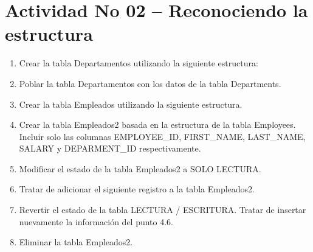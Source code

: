 \section{Actividad No 02 – Reconociendo la estructura} 

\begin{enumerate}[1.]
	\item Crear la tabla Departamentos utilizando la siguiente estructura:
	\item Poblar la tabla Departamentos con los datos de la tabla Departments.
	\item Crear la tabla Empleados utilizando la siguiente estructura.
	\item Crear la tabla Empleados2 basada en la estructura de la tabla Employees. Incluir solo las columnas EMPLOYEE\_ID, FIRST\_NAME, LAST\_NAME, SALARY y DEPARMENT\_ID respectivamente.
	\item Modificar el estado de la tabla Empleados2 a SOLO LECTURA.
	\item Tratar de adicionar el siguiente registro a la tabla Empleados2.
	\item Revertir el estado de la tabla LECTURA / ESCRITURA. Tratar de insertar nuevamente la información del punto 4.6.
	\item Eliminar la tabla Empleados2.
\end{enumerate}

